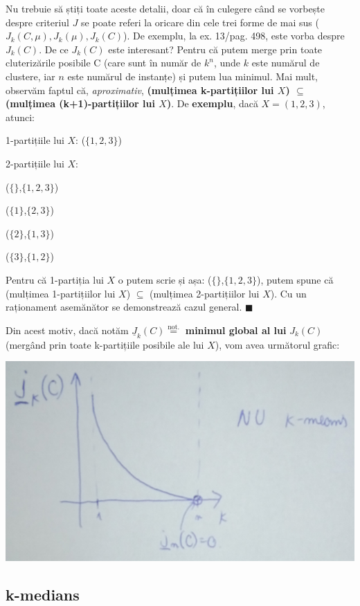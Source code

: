 \documentclass[12pt]{article}
\begin{document}
	Nu trebuie să știți toate aceste detalii, doar că în culegere când se vorbește despre criteriul $J$ se poate referi la oricare din cele trei forme de mai sus ($J_k(C,\mu), J_k(\mu), J_k(C)$). De exemplu, la ex. 13/pag. 498, este vorba despre $J_k(C)$. De ce $J_k(C)$ este interesant? Pentru că putem merge prin toate cluterizările posibile C (care sunt în număr de $k^n$, unde $k$ este numărul de clustere, iar $n$ este numărul de instanțe) și putem lua minimul. Mai mult, observăm faptul că, \textit{aproximativ}, \textbf{(mulțimea k-partițiilor lui $X$) $\subseteq$ (mulțimea (k+1)-partițiilor lui $X$)}. 
	\newpage
	De \textbf{exemplu}, dacă $X=(1,2,3)$, atunci:
	
	1-partițiile lui $X$: ($\{1,2,3\}$)
	
	2-partițiile lui $X$: 
	
	($\{\}$,$\{1,2,3\}$)
	
	($\{1\}$,$\{2,3\}$)
	
	($\{2\}$,$\{1,3\}$)
	
	($\{3\}$,$\{1,2\}$)
	
	Pentru că 1-partiția lui $X$ o putem scrie și așa: ($\{\}$,$\{1,2,3\}$), putem spune că (mulțimea 1-partițiilor lui $X$) $\subseteq$ (mulțimea 2-partițiilor lui $X$). Cu un raționament asemănător se demonstrează cazul general. $\blacksquare$
	
	Din acest motiv, dacă notăm $\underline{J}_k(C) \stackrel{\text{not.}}{=}$ \textbf{minimul global al lui} $J_k(C)$ (mergând prin toate k-partițiile posibile ale lui $X$), vom avea următorul grafic:
	\begin{center}
		\includegraphics[width=1\linewidth]{screenshot007}
	\end{center}
	

	\subsection{k-medians}
	
\end{document}
